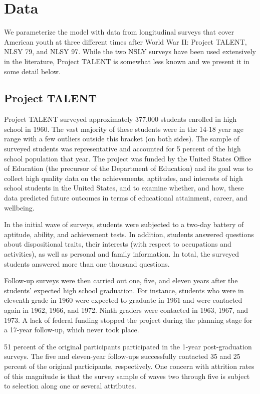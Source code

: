 \documentclass[onehalfspacing,11pt]{article}
\begin{document}
\section{Data}\label{sec:data}

We parameterize the model with data from longitudinal surveys that cover American youth at three different times after World War II: Project TALENT, NLSY 79, and NLSY 97. While the two NSLY surveys have been used extensively in the literature, Project TALENT is somewhat less known and we present it in some detail below.
\subsection{Project TALENT}

Project TALENT surveyed approximately 377,000 students enrolled in high school in 1960. The vast majority of these students were in the 14-18 year age range with a few outliers outside this bracket (on both sides). The sample of surveyed students was representative and accounted for 5 percent of the high school population that year. The project was funded by the United States Office of Education (the precursor of the Department of Education) and its goal was to collect high quality data on the achievements, aptitudes, and interests of high school students in the United States, and to examine whether, and how, these data predicted future outcomes in terms of educational attainment, career, and wellbeing.

In the initial wave of surveys, students were subjected to a two-day battery of aptitude, ability, and achievement tests. In addition, students answered questions about dispositional traits, their interests (with respect to occupations and activities), as well as personal and family information. 	In total, the surveyed students answered more than one thousand questions.

Follow-up surveys were then carried out one, five, and eleven years after the students' expected high school graduation. For instance, students who were in eleventh grade in 1960 were expected to graduate in 1961 and were contacted again in 1962, 1966, and 1972. Ninth graders were contacted in 1963, 1967, and 1973. A lack of federal funding stopped the project during the planning stage for a 17-year follow-up, which never took place.

51 percent of the original participants participated in the 1-year post-graduation surveys. The five and eleven-year follow-ups successfully contacted 35 and 25 percent of the original participants, respectively. One concern with attrition rates of this magnitude is that the survey sample of waves two through five is subject to selection along one or several attributes.
\end{document}
